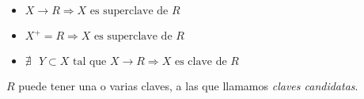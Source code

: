 \documentclass[preview]{standalone}
\begin{document}
\begin{itemize}
\item $X\rightarrow R \Longrightarrow X \text{ es superclave de } R$
\item $X^+ = R \Longrightarrow X \text{ es superclave de } R$
\item $\nexists \text{ } Y \subset X \text{ tal que } X\rightarrow R \Longrightarrow X \text{ es clave de } R$
\end{itemize}
$R$ puede tener una o varias claves, a las que llamamos \textit{claves candidatas}.
\end{document}
